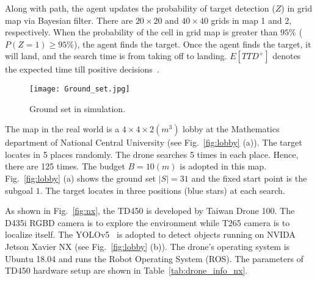 Along with path, the agent updates the probability of target detection ($Z$) in grid map via Bayesian filter.
There are $20 \times 20$ and $40 \times 40$ grids in map 1 and 2, respectively.
When the probability of the cell in grid map is greater than $95\%$ ($P(Z = 1)\ge 95 \%$), the agent finds the target.
Once the agent finds the target, it will land, and the search time is from taking off to landing.
$E[TTD^+]$ denotes the expected time till positive decisions~\cite{chung2011analysis}.


\begin{figure}[htbp]
  \centering
  \texttt{[image: Ground\_set.jpg]}
  \caption{Ground set in simulation.}
  \label{fig:Ground_set}
\end{figure}

The map in the real world is a $4\times 4 \times 2 (m^3)$ lobby at the Mathematics department of National Central University (see Fig.~\ref{fig:lobby} (a)).
The target locates in 5 places randomly.
The drone searches 5 times in each place.
Hence, there are 125 times.
The budget $B=10 (m)$ is adopted in this map.
Fig.~\ref{fig:lobby} (a) shows the ground set $|S| = 31$ and the fixed start point is the subgoal $1$.
The target locates in three positions (blue stars) at each search.

As shown in Fig.~\ref{fig:nx}, the TD450 is developed by Taiwan Drone 100.
The D435i RGBD camera is to explore the environment while T265 camera is to localize itself.
The YOLOv5~\cite{glenn_jocher_2022_7347926} is adopted to detect objects running on NVIDA Jetson Xavier NX (see Fig.~\ref{fig:lobby} (b)).
The drone's operating system is Ubuntu 18.04 and runs the Robot Operating System (ROS).
The parameters of TD450 hardware setup are shown in Table~\ref{tab:drone_info_nx}.

